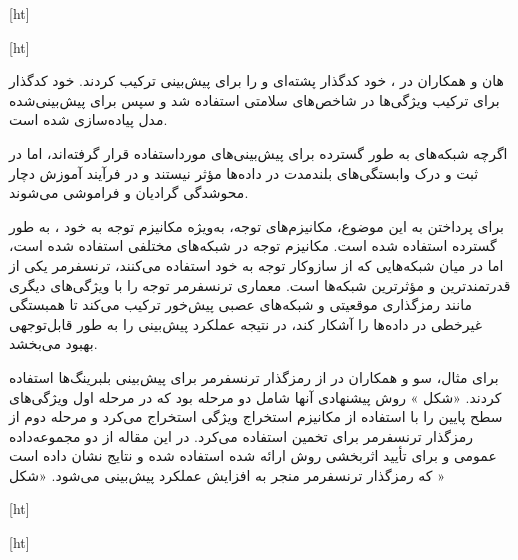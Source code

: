 [ht]



[ht]



 هان و همکاران در ، خود کدگذار پشته‌ای و  را برای پیش‌بینی  ترکیب کردند. خود کدگذار برای ترکیب ویژگی‌ها در شاخص‌های سلامتی استفاده شد و سپس  برای پیش‌بینی‌شده مدل پیاده‌سازی شده است.
 
 
 
 اگرچه شبکه‌های  به طور گسترده برای پیش‌بینی‌های  مورداستفاده قرار گرفته‌اند، اما در ثبت و درک وابستگی‌های بلندمدت در داده‌ها مؤثر نیستند و در فرآیند آموزش دچار محوشدگی گرادیان و فراموشی می‌شوند. 
 
 برای پرداختن به این موضوع، مکانیزم‌های توجه، به‌ویژه مکانیزم توجه به خود ، به طور گسترده استفاده شده است. مکانیزم توجه در شبکه‌های مختلفی استفاده شده است، اما در میان شبکه‌هایی که از سازوکار توجه به خود استفاده می‌کنند، ترنسفرمر یکی از قدرتمندترین و مؤثرترین شبکه‌ها است. معماری ترنسفرمر توجه را با ویژگی‌های دیگری مانند رمزگذاری موقعیتی و شبکه‌های عصبی پیش‌خور ترکیب می‌کند تا همبستگی غیرخطی در داده‌ها را آشکار کند، در نتیجه عملکرد پیش‌بینی را به طور قابل‌توجهی بهبود می‌بخشد.




برای مثال، سو و همکاران در  از رمزگذار ترنسفرمر برای پیش‌بینی  بلبرینگ‌ها استفاده کردند. «شکل » روش پیشنهادی آنها شامل دو مرحله بود که در مرحله اول ویژگی‌های سطح پایین را با استفاده از مکانیزم استخراج ویژگی استخراج می‌کرد و مرحله دوم از رمزگذار ترنسفرمر برای تخمین  استفاده می‌کرد. در این مقاله از دو مجموعه‌داده عمومی  و  برای تأیید اثربخشی روش ارائه شده استفاده شده و نتایج نشان داده است که رمزگذار ترنسفرمر منجر به افزایش عملکرد پیش‌بینی می‌شود. «شکل »



[ht]



[ht]



